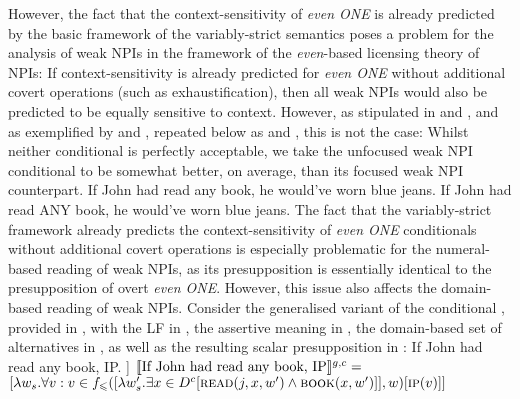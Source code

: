 However, the fact that the context-sensitivity of \textit{even \MakeUppercase{one}} is already predicted by the basic framework of the variably-strict semantics poses a problem for the analysis of weak NPIs in the framework of the \textit{even}-based licensing theory of NPIs: If context-sensitivity is already predicted for \textit{even \MakeUppercase{one}} without additional covert operations (such as exhaustification), then all weak NPIs would also be predicted to be equally sensitive to context. However, as stipulated in  and , and as exemplified by  and , repeated below as  and , this is not the case: Whilst neither conditional is perfectly acceptable, we take the unfocused weak NPI conditional to be somewhat better, on average, than its focused weak NPI counterpart.
\pex[nopreamble=true]%
\a{} \ljudge{\%}If John had read any book, he would've worn blue jeans.
\a{}\ljudge{\#} If John had read \MakeUppercase{any} book, he would've worn blue jeans.
\xe
The fact that the variably-strict framework already predicts the context-sensitivity of \textit{even \MakeUppercase{one}} conditionals without additional covert operations is especially problematic for the numeral-based reading of weak NPIs, as its presupposition is essentially identical to the presupposition of overt \textit{even \MakeUppercase{one}}. However, this issue also affects the domain-based reading of weak NPIs. Consider the generalised variant of the conditional , provided in , with the LF in , the assertive meaning in , the domain-based set of alternatives in , as well as the resulting scalar presupposition in :
\pex[nopreamble=true]\label{ex:vs-neutral-conditional-any}%
\a{} If John had read any book, IP.
\a[]\phantomsection [even\textsubscript{C} [If John had read any book IP]]
\a{} $\intension[g,c]{If John had read any book, IP}=$\\$[\lambda w_s.\forall v:v\in f_\leqslant([\lambda w'_s.\exists{x\in{D^c}}[\predicate{read}(j,x,w')\land\predicate{book}(x,w')]],w)[\predicate{ip}(v)]]$
